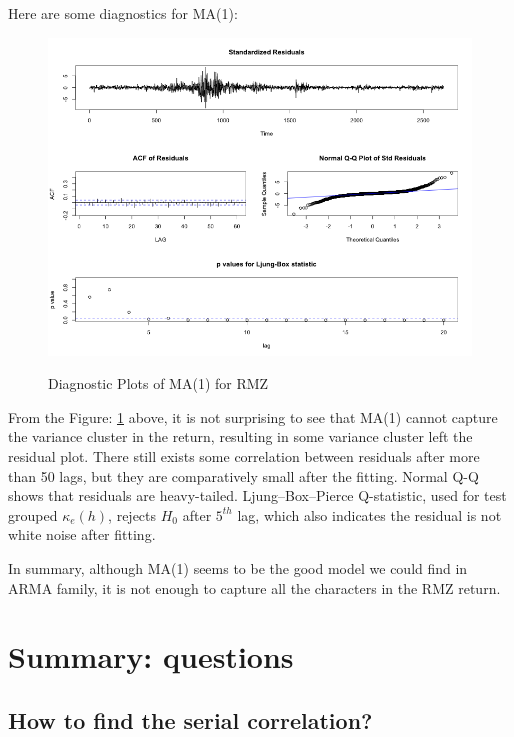 \documentclass[12pt]{article}
\begin{document}
Here are some diagnostics for MA(1):
\begin{figure}
  \caption{Diagnostic Plots of MA(1) for RMZ}
  \includegraphics[width = 1\textwidth]{../results/DiagnosticRMZ}
  \label{fig:DiagnosticRMZ}
\end{figure}

From the Figure: \ref{fig:DiagnosticRMZ} above, it is not surprising to see that MA(1) cannot capture the variance cluster in the return, resulting in some variance cluster left the residual plot. There still exists some correlation between residuals after more than 50 lags, but they are comparatively small after the fitting. Normal Q-Q shows that residuals are heavy-tailed. Ljung–Box–Pierce Q-statistic, used for test grouped $\kappa_e(h)$, rejects $H_0$ after $5^{th}$ lag, which also indicates the residual is not white noise after fitting.

In summary, although MA(1) seems to be the good model we could find in ARMA family, it is not enough to capture all the characters in the RMZ return.

\iffalse

\section{Summary: questions}

\subsection{How to find the serial correlation?}
\end{document}
